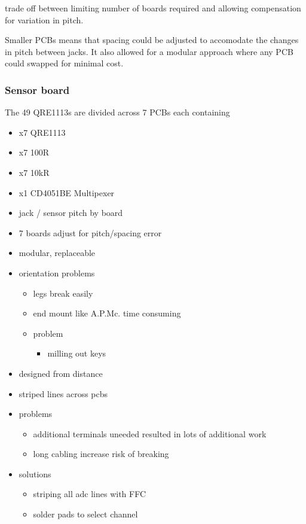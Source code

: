 trade off between limiting number of boards required and allowing
compensation for variation in pitch.

Smaller PCBs means that spacing could be adjusted to accomodate the
changes in pitch between jacks. It also allowed for a modular approach
where any PCB could swapped for minimal cost.

\subsubsection{Sensor board}\label{sensor-board}

The 49 QRE1113s are divided across 7 PCBs each containing

\begin{itemize}
\item
  x7 QRE1113
\item
  x7 100R
\item
  x7 10kR
\item
  x1 CD4051BE Multipexer
\item
  jack / sensor pitch by board
\item
  7 boards adjust for pitch/spacing error
\item
  modular, replaceable
\item
  orientation problems

  \begin{itemize}
  \item
    legs break easily
  \item
    end mount like A.P.Mc. time consuming
  \item
    problem

    \begin{itemize}
    \item
      milling out keys
    \end{itemize}
  \end{itemize}
\item
  designed from distance
\item
  striped lines across pcbs
\item
  problems

  \begin{itemize}
  \item
    additional terminals uneeded resulted in lots of additional work
  \item
    long cabling increase risk of breaking
  \end{itemize}
\item
  solutions

  \begin{itemize}
  \item
    striping all adc lines with FFC
  \item
    solder pads to select channel
  \end{itemize}
\end{itemize}

